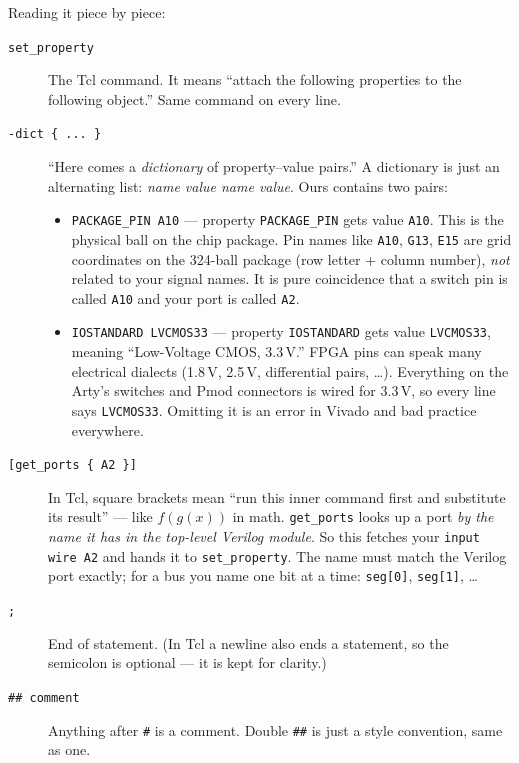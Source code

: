 \documentclass[11pt]{article}
\begin{document}
Reading it piece by piece:

\begin{description}
  \item[\texttt{set\_property}] The Tcl command. It means ``attach the
    following properties to the following object.'' Same command on every
    line.
  \item[\texttt{-dict \{ ... \}}] ``Here comes a \emph{dictionary} of
    property--value pairs.'' A dictionary is just an alternating list:
    \emph{name value name value}. Ours contains two pairs:
    \begin{itemize}
      \item \texttt{PACKAGE\_PIN A10} --- property \texttt{PACKAGE\_PIN}
        gets value \texttt{A10}. This is the physical ball on the chip
        package. Pin names like \texttt{A10}, \texttt{G13}, \texttt{E15}
        are grid coordinates on the 324-ball package (row letter + column
        number), \emph{not} related to your signal names. It is pure
        coincidence that a switch pin is called \texttt{A10} and your port
        is called \texttt{A2}.
      \item \texttt{IOSTANDARD LVCMOS33} --- property \texttt{IOSTANDARD}
        gets value \texttt{LVCMOS33}, meaning ``Low-Voltage CMOS,
        3.3\,V.'' FPGA pins can speak many electrical dialects (1.8\,V,
        2.5\,V, differential pairs, \dots). Everything on the Arty's
        switches and Pmod connectors is wired for 3.3\,V, so every line
        says \texttt{LVCMOS33}. Omitting it is an error in Vivado and bad
        practice everywhere.
    \end{itemize}
  \item[{\texttt{[get\_ports \{ A2 \}]}}] In Tcl, square brackets mean
    ``run this inner command first and substitute its result'' --- like
    $f(g(x))$ in math. \texttt{get\_ports} looks up a port \emph{by the
    name it has in the top-level Verilog module}. So this fetches your
    \texttt{input wire A2} and hands it to \texttt{set\_property}. The
    name must match the Verilog port exactly; for a bus you name one bit
    at a time: \texttt{seg[0]}, \texttt{seg[1]}, \dots
  \item[\texttt{;}] End of statement. (In Tcl a newline also ends a
    statement, so the semicolon is optional --- it is kept for clarity.)
  \item[\texttt{\#\# comment}] Anything after \texttt{\#} is a comment.
    Double \texttt{\#\#} is just a style convention, same as one.
\end{description}
\end{document}
